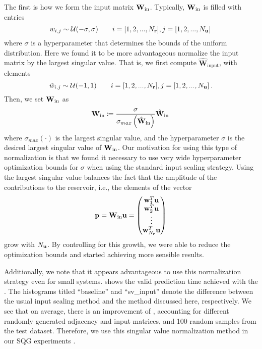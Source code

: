 The first is how we form the input matrix $\mathbf{W}_\text{in}$.
Typically, $\mathbf{W}_\text{in}$ is filled with entries
\begin{equation*}
    w_{i,j} \sim \mathcal{U}(-\sigma,\sigma) \qquad
    i = [1, 2, ..., N_{\mathbf{r}}], j=[1,2, ..., N_{\mathbf{u}}] \,
\end{equation*}
where $\sigma$ is a hyperparameter that determines the bounds of the uniform
distribution.
Here we found it to be more advantageous normalize the input matrix by the
largest singular value.
That is, we first compute $\hat{\mathbf{W}}_\text{input}$, with elements
\begin{equation*}
    \hat{w}_{i,j} \sim \mathcal{U}(-1,1) \qquad
    i = [1, 2, ..., N_{\mathbf{r}}], j=[1,2, ..., N_{\mathbf{u}}] \, .
\end{equation*}
Then, we set $\mathbf{W}_\text{in}$ as
\begin{equation*}
    \mathbf{W}_\text{in} \coloneqq
    \dfrac{\sigma}{\sigma_{max}\left(\hat{\mathbf{W}}_\text{in}\right)}
    \hat{\mathbf{W}}_\text{in} \,
\end{equation*}
where $\sigma_{max}\left(\cdot\right)$ is the largest singular value, and
the hyperparameter $\sigma$ is the desired largest singular value of
$\mathbf{W}_\text{in}$.
Our motivation for using this type of normalization is that we found it
necessary to use very wide hyperparameter optimization bounds for $\sigma$ when
using the standard input scaling strategy.
Using the largest singular value balances the fact that
the amplitude of the contributions to the reservoir, i.e., the elements of the
vector
\begin{equation*}
    \mathbf{p} = \mathbf{W}_\text{in} \mathbf{u} =
    \begin{pmatrix}
        \mathbf{w}_1^T\mathbf{u} \\
        \mathbf{w}_2^T\mathbf{u} \\
        \vdots \\
        \mathbf{w}_{N_{\mathbf{r}}}^T\mathbf{u}
    \end{pmatrix}
\end{equation*}
grow with $N_{\mathbf{u}}$.
By controlling for this growth, we were able to reduce the optimization bounds
and started achieving more sensible results.

Additionally, we note that it appears advantageous to use this normalization
strategy even for small systems.
 shows the valid prediction time achieved with the .
The histograms titled ``baseline'' and ``sv\_input'' denote the difference
between the usual input scaling method and the method discussed here,
respectively.
We see that on average, there is an improvement of ,
accounting for different randomly generated adjacency and input matrices, and
100 random samples from the test dataset.
Therefore, we use this singular value normalization method in our SQG
experiments .

